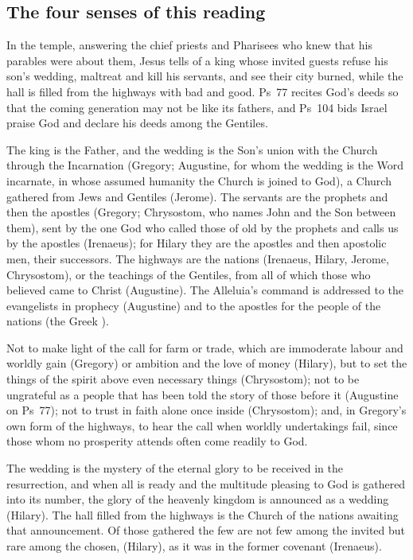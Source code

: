 \subsection{The four senses of this reading}

\begin{fourSenses}
\item[Literal.] In the temple, answering the chief priests and Pharisees who
knew that his parables were about them, Jesus tells of a king whose invited
guests refuse his son's wedding, maltreat and kill his servants, and see their
city burned, while the hall is filled from the highways with bad and good.
Ps~77 recites God's deeds so that the coming generation may not be like its
fathers, and Ps~104 bids Israel praise God and declare his deeds among the
Gentiles.

\item[Allegorical.] The king is the Father, and the wedding is the Son's union
with the Church through the Incarnation (Gregory; Augustine, for whom the
wedding is the Word incarnate, in whose assumed humanity the Church is joined
to God), a Church gathered from Jews and Gentiles (Jerome). The servants are
the prophets and then the apostles (Gregory; Chrysostom, who names John and the
Son between them), sent by the one God who called those of old by the prophets
and calls us by the apostles (Irenaeus); for Hilary they are the apostles and
then apostolic men, their successors. The highways are the nations (Irenaeus,
Hilary, Jerome, Chrysostom), or the teachings of the Gentiles, from all of
which those who believed came to Christ (Augustine). The Alleluia's command is
addressed to the evangelists in prophecy (Augustine) and to the apostles for
the people of the nations (the Greek ).

\item[Moral.] Not to make light of the call for farm or trade, which are
immoderate labour and worldly gain (Gregory) or ambition and the love of money
(Hilary), but to set the things of the spirit above even necessary things
(Chrysostom); not to be ungrateful as a people that has been told the story of
those before it (Augustine on Ps~77); not to trust in faith alone once inside
(Chrysostom); and, in Gregory's own form of the highways, to hear the call
when worldly undertakings fail, since those whom no prosperity attends often
come readily to God.

\item[Anagogical.] The wedding is the mystery of the eternal glory to be
received in the resurrection, and when all is ready and the multitude pleasing
to God is gathered into its number, the glory of the heavenly kingdom is
announced as a wedding (Hilary). The hall filled from the highways is the
Church of the nations awaiting that announcement. Of those gathered the few are
not few among the invited but rare among the chosen,  (Hilary), as it was in the former
covenant (Irenaeus).
\end{fourSenses}
